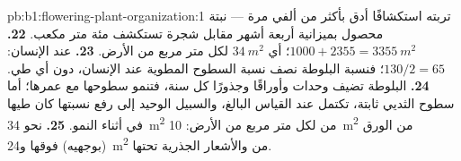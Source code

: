 \begin{solution}{pb:b1:flowering-plant-organization:1}
تربته استكشافًا أدق بأكثر من ألفي مرة --- نبتة محصول بميزانية أربعة
أشهر مقابل شجرة تستكشف مئة متر مكعب.
\textbf{22.} $1000 + 2355 = \qty{3355}{m^2}$؛ أي $\qty{34}{m^2}$
لكل متر مربع من الأرض.
\textbf{23.} عند الإنسان: $130/2 = 65$؛ فنسبة البلوطة نصف نسبة
السطوح المطوية عند الإنسان، دون أي طي.
\textbf{24.} البلوطة تضيف وحدات وأوراقًا وجذورًا كل سنة، فتنمو
سطوحها مع عمرها؛ أما سطوح الثديي  ثابتة، تكتمل عند القياس
البالغ، والسبيل الوحيد إلى رفع نسبتها كان طيها في أثناء النمو.
\textbf{25.} نحو \qty{34}{m^2} من  لكل متر مربع من
الأرض: \qty{10}{m^2} من الورق (بوجهيه) فوقها و\qty{24}{m^2} من
 والأشعار الجذرية تحتها.
\end{solution}
